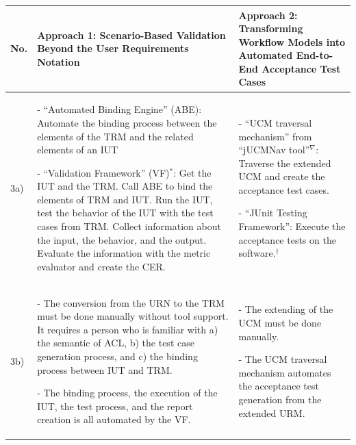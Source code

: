 \newpage
{}
\begin{landscape}
	\begin{small}
	\begin{table}
		\caption{Synthesis Matrix part 2/2.}
		\begin{longtable}[h]{>{\raggedright}p{0.5cm}|>{}p{11cm}|>{}p{11cm}}
			\hline
			\textbf{No.} 
			& \textbf{Approach 1: Scenario-Based Validation Beyond the User Requirements Notation} 
			& \textbf{Approach 2: Transforming Workflow Models into Automated End-to-End Acceptance Test Cases}\\ 
			\hline %
			3a)
			& - \enquote{Automated Binding Engine} (ABE): Automate the binding process between the elements of the TRM and the related elements of an IUT
			
			- \enquote{Validation Framework} (VF)$^*$: Get the IUT and the TRM. Call ABE to bind the elements of TRM and IUT. Run the IUT, test the behavior of the IUT with the test cases from TRM. Collect information about the input, the behavior, and the output. Evaluate the information with the metric evaluator and create the CER.
			& 		
			- \enquote{UCM traversal mechanism} from \enquote{jUCMNav tool}$^\nabla$: Traverse the extended UCM and create the acceptance test cases.
			
			- \enquote{JUnit Testing Framework}: Execute the acceptance tests on the software.$^\dagger$\\ 
			\hline
			3b) 
			& - The conversion from the URN to the TRM must be done manually without tool support. It requires a person who is familiar with a) the semantic of ACL, b) the test case generation process, and c) the binding process between IUT and TRM.  
			
			- The binding process, the execution of the IUT, the test process, and the report creation is all automated by the VF.
			& 
			- The extending of the UCM must be done manually.
			
			- The UCM traversal mechanism automates the acceptance test generation from the extended URM.
			

\end{longtable}
\end{table}
\end{small}
\end{landscape}
